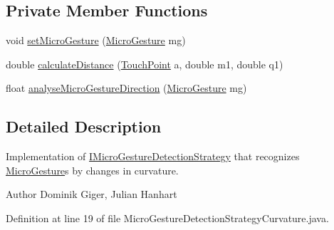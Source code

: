 \subsection*{Private Member Functions}
\begin{DoxyCompactItemize}
\item 
void \hyperlink{classch_1_1zhaw_1_1ba10__bsha__1_1_1strategies_1_1MicroGestureDetectionStrategyCurvature_a8e53337041e648e2e5f9c72cc74d7a0e}{setMicroGesture} (\hyperlink{classch_1_1zhaw_1_1ba10__bsha__1_1_1service_1_1MicroGesture}{MicroGesture} mg)
\item 
double \hyperlink{classch_1_1zhaw_1_1ba10__bsha__1_1_1strategies_1_1MicroGestureDetectionStrategyCurvature_aa729634754fd1d0e1d5c4f0c5b403500}{calculateDistance} (\hyperlink{classch_1_1zhaw_1_1ba10__bsha__1_1_1TouchPoint}{TouchPoint} a, double m1, double q1)
\item 
float \hyperlink{classch_1_1zhaw_1_1ba10__bsha__1_1_1strategies_1_1MicroGestureDetectionStrategyCurvature_a7d6da421d9cd91b8eccad94f0755a0f0}{analyseMicroGestureDirection} (\hyperlink{classch_1_1zhaw_1_1ba10__bsha__1_1_1service_1_1MicroGesture}{MicroGesture} mg)
\end{DoxyCompactItemize}


\subsection{Detailed Description}
Implementation of \hyperlink{interfacech_1_1zhaw_1_1ba10__bsha__1_1_1strategies_1_1IMicroGestureDetectionStrategy}{IMicroGestureDetectionStrategy} that recognizes \hyperlink{}{MicroGesture}s by changes in curvature.

\begin{DoxyAuthor}{Author}
Dominik Giger, Julian Hanhart 
\end{DoxyAuthor}


Definition at line 19 of file MicroGestureDetectionStrategyCurvature.java.

